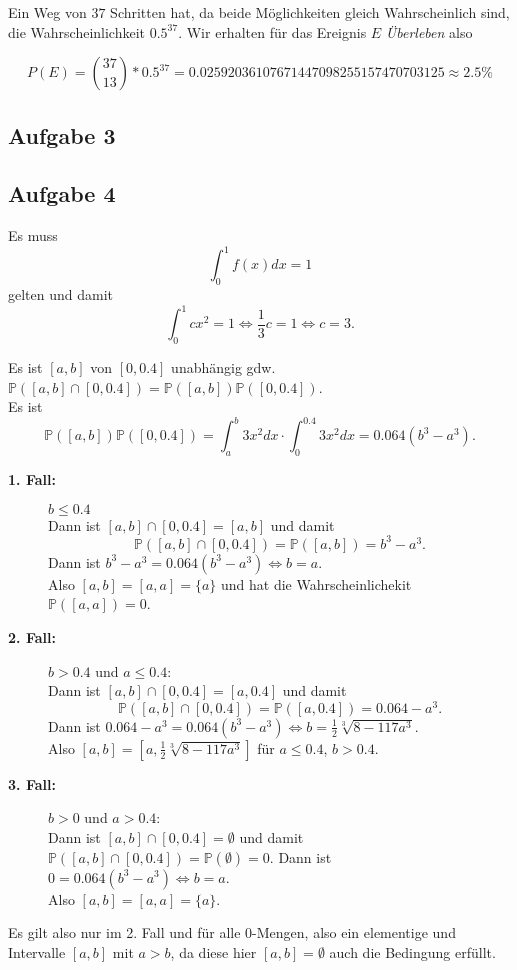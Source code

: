 \documentclass[11pt,a4paper,ngerman]{article}
\newcommand{\Prob}{\mathbb{P}}
\begin{document}
Ein Weg von $37$ Schritten hat, da beide Möglichkeiten gleich Wahrscheinlich sind, die Wahrscheinlichkeit $0.5^{37}$. Wir erhalten für
das Ereignis $E$ \emph{Überleben} also

\[
    P(E) = \binom{37}{13} * 0.5^{37} = 0.02592036107671447098255157470703125 \approx 2.5\%
\]

\subsection*{Aufgabe 3}


\subsection*{Aufgabe 4}

Es muss 
\[
    \int_0^1 f(x) dx = 1
\] gelten und damit 
\[
    \int_0^1 c x^2 = 1 \Leftrightarrow \frac{1}{3}c = 1 \Leftrightarrow c = 3.
\]

Es ist $[a,b]$ von $[0,0.4]$ unabhängig gdw. $\Prob([a,b] \cap [0,0.4]) = \Prob([a,b]) \Prob([0,0.4])$.\\
Es ist 
\[
    \Prob([a,b]) \Prob([0,0.4]) = \int_a^b 3x^2 dx \cdot \int_0^{0.4} 3x^2 dx = 0.064 (b^3 - a^3).
\]

\begin{description}

    \item[\bfseries 1. Fall:] $b \leq 0.4$ \\
        Dann ist $[a,b] \cap [0,0.4] = [a,b]$ und damit 
        \[
            \Prob([a,b] \cap [0,0.4]) = \Prob([a,b]) = b^3 - a^3.
        \]
        Dann ist $ b^3 - a^3 =  0.064 (b^3 - a^3) \Leftrightarrow b = a$. \\
        Also $[a,b] = [a,a] = \{a\}$ und hat die Wahrscheinlichekit $\Prob ([a,a]) = 0$. \\
    \item[\bfseries 2. Fall:] $b > 0.4$ und $a \leq 0.4$: \\
        Dann ist $[a,b] \cap [0,0.4] = [a, 0.4]$ und damit 
        \[
            \Prob([a,b] \cap [0,0.4]) = \Prob([a,0.4]) = 0.064 - a^3.
        \]
        Dann ist $ 0.064 - a^3 =  0.064 (b^3 - a^3) \Leftrightarrow b = \frac{1}{2} \sqrt[3]{8-117a^3}$. \\
        Also $[a,b] = [a,\frac{1}{2} \sqrt[3]{8-117a^3}]$ für $a \leq 0.4$, $b > 0.4$. \\

    \item[\bfseries 3. Fall:] $b > 0$ und $ a > 0.4$: \\
        Dann ist $[a,b] \cap [0,0.4] = \emptyset$ und damit  $\Prob([a,b] \cap [0,0.4]) = \Prob(\emptyset) =0$.
        Dann ist $ 0=  0.064 (b^3 - a^3) \Leftrightarrow b = a$. \\
        Also $[a,b] = [a,a] = \{a\}$.\\
\end{description}

    Es gilt also nur im 2. Fall und für alle $0$-Mengen, also ein elementige und Intervalle $[a,b]$ mit $a>b$, da diese
    hier $[a,b] = \emptyset$ auch die Bedingung erfüllt.

\label{LastPage}
\end{document}
